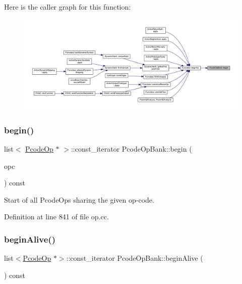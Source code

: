 Here is the caller graph for this function\+:
\nopagebreak
\begin{figure}[H]
\begin{center}
\leavevmode
\includegraphics[width=350pt]{class_pcode_op_bank_aa5c89c7f2fbad97596cef0e46b4f3a8e_icgraph}
\end{center}
\end{figure}
\mbox{\label{class_pcode_op_bank_aea81ae2f9b0e176090a6b9f54107bc54}} 
\subsubsection{\texorpdfstring{begin()}{begin()}\hspace{0.1cm}{\footnotesize\ttfamily [2/2]}}
{\footnotesize\ttfamily list$<$ \mbox{\hyperlink{class_pcode_op}{Pcode\+Op}} $\ast$ $>$\+::const\+\_\+iterator Pcode\+Op\+Bank\+::begin (\begin{DoxyParamCaption}\item[{\mbox{\hyperlink{opcodes_8hh_abeb7dfb0e9e2b3114e240a405d046ea7}{Op\+Code}}}]{opc }\end{DoxyParamCaption}) const}



Start of all Pcode\+Ops sharing the given op-\/code. 



Definition at line 841 of file op.\+cc.

\mbox{\label{class_pcode_op_bank_a6c299f27d8d5aafd64fdd91324cddc24}} 
\subsubsection{\texorpdfstring{beginAlive()}{beginAlive()}}
{\footnotesize\ttfamily list$<$\mbox{\hyperlink{class_pcode_op}{Pcode\+Op}} $\ast$$>$\+::const\+\_\+iterator Pcode\+Op\+Bank\+::begin\+Alive (\begin{DoxyParamCaption}\item[{void}]{ }\end{DoxyParamCaption}) const\hspace{0.3cm}{\ttfamily [inline]}}



